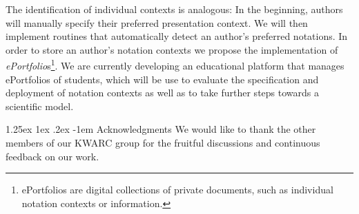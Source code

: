 \documentclass[pdftex,bibtotocnumbered,idxtotoc,11pt]{scrartcl}
\makeatletter
\renewcommand\paragraph{\@startsection{paragraph}{4}{\z@}%
{1.25ex \@plus1ex \@minus.2ex}%
{-1em}%
{\setlength{\parfillskip}{\z@ \@plus 1fil}%
\raggedsection\normalfont\sectfont\nobreak
\size@paragraph\nobreak}}
\makeatother
\begin{document}
The identification of individual contexts is analogous: In the beginning, authors will
manually specify their preferred presentation context. We will then implement routines
that automatically detect an author's preferred notations. In order to store an author's
notation contexts we propose the implementation of
{\emph{ePortfolio}}s\footnote{ePortfolios are digital collections of private documents,
  such as individual notation contexts or {\cop} information.}. We are currently
developing an educational platform that manages ePortfolios of students, which will be use
to evaluate the specification and deployment of notation contexts as well as to take
further steps towards a scientific {\cop} model.

\paragraph{Acknowledgments}\label{sec:ack}
We would like to thank the other members of our KWARC group for the fruitful discussions
and continuous feedback on our work.



\begin{footnotesize}
 

\end{footnotesize}
\end{document}
